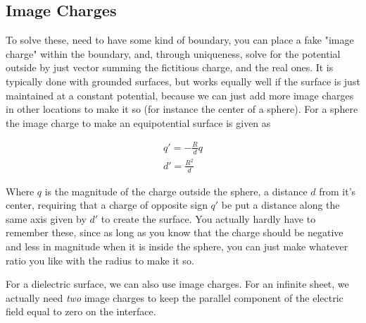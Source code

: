 \subsection{Image Charges}
To solve these, need to have some kind of boundary, you can place a fake "image charge" within the boundary, and, through uniqueness, solve for the potential outside by just vector summing the  fictitious charge, and the real ones. It is typically done with grounded surfaces, but works equally well if the surface is just maintained at a constant potential, because we can just add more image charges in other locations to make it so (for instance the center of a sphere). For a sphere the image charge to make an equipotential surface is given as

\begin{align}
q' = -\frac{R}{d}q\\
d' = \frac{R^2}{d}
\end{align}

Where $q$ is the magnitude of the charge outside the sphere, a distance $d$ from it's center, requiring that a charge of opposite sign $q'$ be put a distance along the same axis given by $d'$ to create the surface. You actually hardly have to remember these, since as long as you know that the charge should be negative and less in magnitude when it is inside the sphere, you can just make whatever ratio you like with the radius to make it so.

For a dielectric surface, we can also use image charges. For an infinite sheet, we actually need \emph{two} image charges to keep the parallel component of the electric field equal to zero on the interface.




